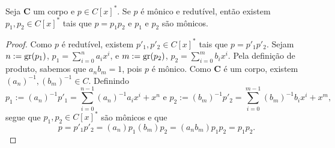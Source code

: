 \begin{proposition}
	Seja $\bm C$ um corpo e $p \in C[x]^*$. Se $p$ é mônico e redutível, então existem $p_1,p_2 \in C[x]^*$ tais que $p=p_1p_2$ e $p_1$ e $p_2$ são mônicos.
\end{proposition}
\begin{proof}
	Como $p$ é redutível, existem $p'_1,p'_2 \in C[x]^*$ tais que $p=p'_1p'_2$. Sejam $n := \operatorname{gr}(p_1)$, $p_1 = \sum_{i=0}^n a_ix^i$, e $m := \operatorname{gr}(p_2)$, $p_2 = \sum_{i=0}^m b_ix^i$. Pela definição de produto, sabemos que $a_nb_m=1$, pois $p$ é mônico. Como $\bm C$ é um corpo, existem $(a_n)^{-1},(b_m)^{-1} \in C$. Definindo
	\begin{equation*}
	p_1 := (a_n)^{-1}p'_1 = \sum_{i=0}^{n-1} (a_n)^{-1}a_ix^i+ x^n \text{\ \ e\ \ } p_2 := (b_m)^{-1}p'_2 = \sum_{i=0}^{m-1} (b_m)^{-1}b_ix^i + x^m,
	\end{equation*}
segue que $p_1,p_2 \in C[x]^*$ são mônicos e que
	\begin{equation*}
	 p = p'_1p'_2 = (a_n)p_1(b_m)p_2 = (a_nb_m)p_1p_2 = p_1p_2.
	\end{equation*}
\end{proof}

